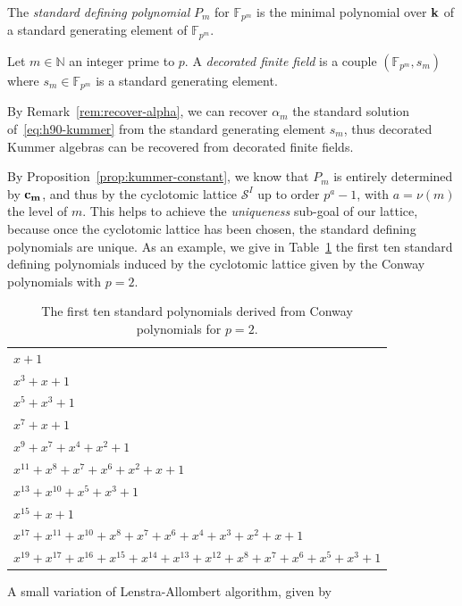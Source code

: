 \begin{defi}
  The \emph{standard defining polynomial} $P_m$ for $\mathbb{F}_{p^{m}}$ is the
  minimal polynomial over $\mathbf{k}$ of a standard generating element of
  $\mathbb{F}_{p^{m}}$.
\end{defi}
\begin{defi}
  Let $m\in\mathbb{N}$ an integer prime to $p$. A \emph{decorated finite field}
  is a couple $(\mathbb{F}_{p^{m}}, s_m)$ where $s_m\in\mathbb{F}_{p^{m}}$ is a
  standard generating element.
\end{defi}
\begin{rem}
  By Remark~\ref{rem:recover-alpha}, we can recover $\alpha_m$ the standard
  solution of~\eqref{eq:h90-kummer} from the standard generating element $s_m$,
  thus decorated Kummer algebras can be recovered from
  decorated finite fields.
\end{rem}
By Proposition~\ref{prop:kummer-constant}, we know that $P_m$ is entirely 
determined by $\mathbf{c_{m}}$, and thus by the cyclotomic lattice $\mathcal S^I$ up
to order $p^a-1$, with $a=\nu(m)$ the level of $m$. This helps to achieve the
\emph{uniqueness} sub-goal of our lattice, because once the cyclotomic lattice
has been chosen, the standard defining polynomials are unique. As an example, we
give in Table~\ref{tab:std-polys} the first ten standard defining polynomials
induced by the cyclotomic lattice given by the Conway polynomials with $p=2$.
\begin{table}
  \centering
  \begin{tabular}{l}
    $x+1$ \\
    $x^3+x+1$ \\
    $x^5+x^3+1$ \\
    $x^7+x+1$ \\
    $x^9+x^7+x^4+x^2+1$\\
    $x^{11}+x^8+x^7+x^6+x^2+x+1$\\
    $x^{13}+x^{10}+x^5+x^3+1$\\
    $x^{15}+x+1$ \\
    $x^{17}+x^{11}+x^{10}+x^8+ x^7+x^6+x^4+x^3+x^2+x+1$ \\
    $x^{19}+x^{17}+x^{16}+x^{15}+x^{14}+x^{13}+x^{12}+x^8+x^7+x^6+x^5+x^3+1$
  \end{tabular}
  \caption{The first ten standard polynomials derived from Conway
    polynomials for $p=2$.}
  \label{tab:std-polys}
\end{table}
A small variation of Lenstra-Allombert algorithm, given by
